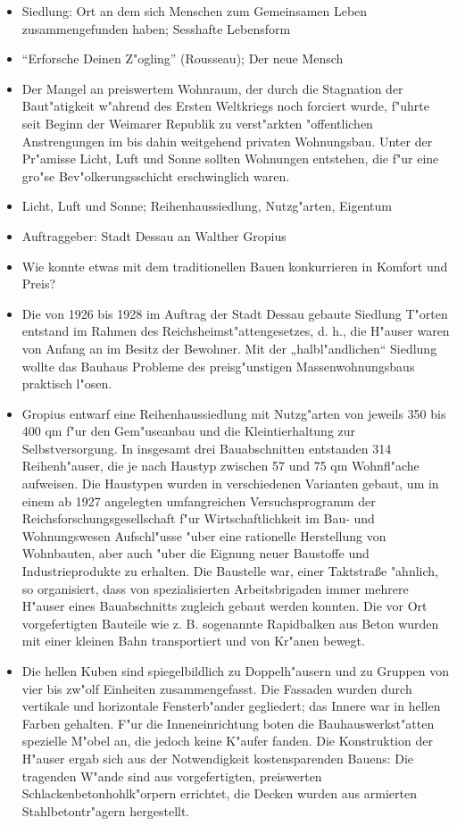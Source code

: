 \documentclass[a5paper]{scrartcl}
\begin{document}
\begin{itemize}
  \item Siedlung: Ort an dem sich Menschen zum Gemeinsamen Leben zusammengefunden haben; Sesshafte Lebensform
  \item "`Erforsche Deinen Z"ogling"' (Rousseau); Der neue Mensch
  \item Der Mangel an preiswertem Wohnraum, der durch die Stagnation der Baut"atigkeit w"ahrend des Ersten Weltkriegs noch forciert wurde, f"uhrte seit Beginn der Weimarer Republik zu verst"arkten "offentlichen Anstrengungen im bis dahin weitgehend privaten Wohnungsbau. Unter der Pr"amisse Licht, Luft und Sonne sollten Wohnungen entstehen, die f"ur eine gro"se Bev"olkerungsschicht erschwinglich waren.
  \item Licht, Luft und Sonne; Reihenhaussiedlung, Nutzg"arten, Eigentum
  \item Auftraggeber: Stadt Dessau an Walther Gropius
  \item Wie konnte etwas mit dem traditionellen Bauen konkurrieren in Komfort und Preis?
  \item Die von 1926 bis 1928 im Auftrag der Stadt Dessau gebaute Siedlung T"orten entstand im Rahmen des Reichsheimst"attengesetzes, d. h., die H"auser waren von Anfang an im Besitz der Bewohner. Mit der „halbl"andlichen“ Siedlung wollte das Bauhaus Probleme des preisg"unstigen Massenwohnungsbaus praktisch l"osen.
  \item Gropius entwarf eine Reihenhaussiedlung mit Nutzg"arten von jeweils 350 bis 400 qm f"ur den Gem"useanbau und die Kleintierhaltung zur Selbstversorgung. In insgesamt drei Bauabschnitten entstanden 314 Reihenh"auser, die je nach Haustyp zwischen 57 und 75 qm Wohnfl"ache aufweisen. Die Haustypen wurden in verschiedenen Varianten gebaut, um in einem ab 1927 angelegten umfangreichen Versuchsprogramm der Reichsforschungsgesellschaft f"ur Wirtschaftlichkeit im Bau- und Wohnungswesen Aufschl"usse "uber eine rationelle Herstellung von Wohnbauten, aber auch "uber die Eignung neuer Baustoffe und Industrieprodukte zu erhalten. Die Baustelle war, einer Taktstraße "ahnlich, so organisiert, dass von spezialisierten Arbeitsbrigaden immer mehrere H"auser eines Bauabschnitts zugleich gebaut werden konnten. Die vor Ort vorgefertigten Bauteile wie z. B. sogenannte Rapidbalken aus Beton wurden mit einer kleinen Bahn transportiert und von Kr"anen bewegt.
  \item Die hellen Kuben sind spiegelbildlich zu Doppelh"ausern und zu Gruppen von vier bis zw"olf Einheiten zusammengefasst. Die Fassaden wurden durch vertikale und horizontale Fensterb"ander gegliedert; das Innere war in hellen Farben gehalten. F"ur die Inneneinrichtung boten die Bauhauswerkst"atten spezielle M"obel an, die jedoch keine K"aufer fanden. Die Konstruktion der H"auser ergab sich aus der Notwendigkeit kostensparenden Bauens: Die tragenden W"ande sind aus vorgefertigten, preiswerten Schlackenbetonhohlk"orpern errichtet, die Decken wurden aus armierten Stahlbetontr"agern hergestellt.

\end{itemize}
\end{document}

